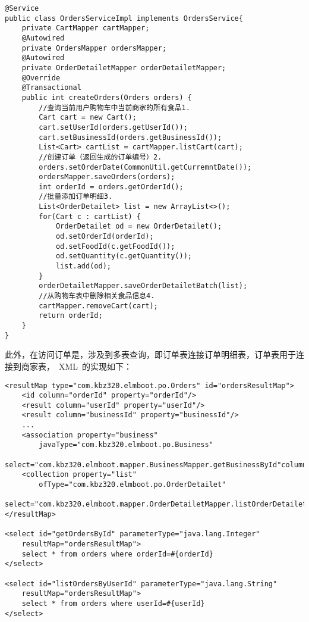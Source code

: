 \begin{lstlisting}[basicstyle=\footnotesize]
@Service
public class OrdersServiceImpl implements OrdersService{
    private CartMapper cartMapper;
    @Autowired
    private OrdersMapper ordersMapper;
    @Autowired
    private OrderDetailetMapper orderDetailetMapper;
    @Override
    @Transactional
    public int createOrders(Orders orders) {
        //查询当前用户购物车中当前商家的所有食品1.
        Cart cart = new Cart();
        cart.setUserId(orders.getUserId());
        cart.setBusinessId(orders.getBusinessId());
        List<Cart> cartList = cartMapper.listCart(cart);
        //创建订单（返回生成的订单编号）2.
        orders.setOrderDate(CommonUtil.getCurremntDate());
        ordersMapper.saveOrders(orders);
        int orderId = orders.getOrderId();
        //批量添加订单明细3.
        List<OrderDetailet> list = new ArrayList<>();
        for(Cart c : cartList) {
            OrderDetailet od = new OrderDetailet();
            od.setOrderId(orderId);
            od.setFoodId(c.getFoodId());
            od.setQuantity(c.getQuantity());
            list.add(od);
        }
        orderDetailetMapper.saveOrderDetailetBatch(list);
        //从购物车表中删除相关食品信息4.
        cartMapper.removeCart(cart);
        return orderId;
    }
}
\end{lstlisting}

此外，在访问订单是，涉及到多表查询，即订单表连接订单明细表，订单表用于连接到商家表，~XML~的实现如下：

\begin{lstlisting}[basicstyle=\footnotesize]
<resultMap type="com.kbz320.elmboot.po.Orders" id="ordersResultMap">
    <id column="orderId" property="orderId"/>
    <result column="userId" property="userId"/>
    <result column="businessId" property="businessId"/>
    ...
    <association property="business"
        javaType="com.kbz320.elmboot.po.Business"
        select="com.kbz320.elmboot.mapper.BusinessMapper.getBusinessById"column="businessId"/>
    <collection property="list"
        ofType="com.kbz320.elmboot.po.OrderDetailet"
        select="com.kbz320.elmboot.mapper.OrderDetailetMapper.listOrderDetailetByOrderId"column="orderId"/>
</resultMap>

<select id="getOrdersById" parameterType="java.lang.Integer"
    resultMap="ordersResultMap">
    select * from orders where orderId=#{orderId}
</select>

<select id="listOrdersByUserId" parameterType="java.lang.String"
    resultMap="ordersResultMap">
    select * from orders where userId=#{userId}
</select>
\end{lstlisting}

